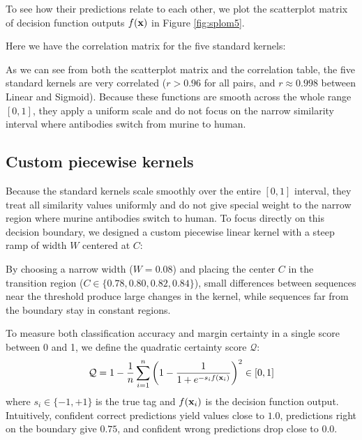 To see how their predictions relate to each other, we plot the scatterplot matrix of decision function outputs $f(\textbf x)$ in Figure \ref{fig:splom5}.



\newpage
Here we have the correlation matrix for the five standard kernels:\futnotetext
{}



As we can see from both the scatterplot matrix and the correlation table, the five standard kernels are very correlated ($r > 0.96$ for all pairs, and $r \approx 0.998$ between Linear and Sigmoid). Because these functions are smooth across the whole range $[0, 1]$, they apply a uniform scale and do not focus on the narrow similarity interval where antibodies switch from murine to human.

\newpage
\subsection{Custom piecewise kernels}
Because the standard kernels scale smoothly over the entire $[0, 1]$ interval, they treat all similarity values uniformly and do not give special weight to the narrow region where murine antibodies switch to human. To focus directly on this decision boundary, we designed a custom piecewise linear kernel with a steep ramp of width $W$ centered at $C$:



By choosing a narrow width ($W = 0.08$) and placing the center $C$ in the transition region ($C \in \{0.78, 0.80, 0.82, 0.84\}$), small differences between sequences near the threshold produce large changes in the kernel, while sequences far from the boundary stay in constant regions.

To measure both classification accuracy and margin certainty in a single score between 0 and 1, we define the quadratic certainty score $\mathcal Q$:
\begin{equation*}
    \mathcal Q = 1 - \frac{1}{n}\sum_{i=1}^n \left(1 - \frac{1}{1 + e^{-s_i f(\textbf x_i)}}\right)^2 \in [0, 1]
\end{equation*}
where $s_i \in \{-1, +1\}$ is the true tag and $f(\textbf x_i)$ is the decision function output. Intuitively, confident correct predictions yield values close to $1.0$, predictions right on the boundary give $0.75$, and confident wrong predictions drop close to $0.0$.

